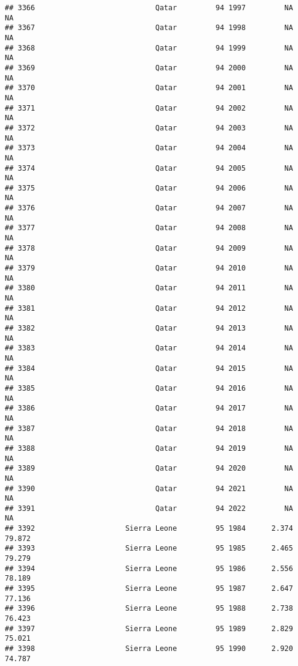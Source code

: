 \documentclass[
]{article}
\begin{document}
\begin{verbatim}
## 3366                            Qatar         94 1997         NA         NA
## 3367                            Qatar         94 1998         NA         NA
## 3368                            Qatar         94 1999         NA         NA
## 3369                            Qatar         94 2000         NA         NA
## 3370                            Qatar         94 2001         NA         NA
## 3371                            Qatar         94 2002         NA         NA
## 3372                            Qatar         94 2003         NA         NA
## 3373                            Qatar         94 2004         NA         NA
## 3374                            Qatar         94 2005         NA         NA
## 3375                            Qatar         94 2006         NA         NA
## 3376                            Qatar         94 2007         NA         NA
## 3377                            Qatar         94 2008         NA         NA
## 3378                            Qatar         94 2009         NA         NA
## 3379                            Qatar         94 2010         NA         NA
## 3380                            Qatar         94 2011         NA         NA
## 3381                            Qatar         94 2012         NA         NA
## 3382                            Qatar         94 2013         NA         NA
## 3383                            Qatar         94 2014         NA         NA
## 3384                            Qatar         94 2015         NA         NA
## 3385                            Qatar         94 2016         NA         NA
## 3386                            Qatar         94 2017         NA         NA
## 3387                            Qatar         94 2018         NA         NA
## 3388                            Qatar         94 2019         NA         NA
## 3389                            Qatar         94 2020         NA         NA
## 3390                            Qatar         94 2021         NA         NA
## 3391                            Qatar         94 2022         NA         NA
## 3392                     Sierra Leone         95 1984      2.374     79.872
## 3393                     Sierra Leone         95 1985      2.465     79.279
## 3394                     Sierra Leone         95 1986      2.556     78.189
## 3395                     Sierra Leone         95 1987      2.647     77.136
## 3396                     Sierra Leone         95 1988      2.738     76.423
## 3397                     Sierra Leone         95 1989      2.829     75.021
## 3398                     Sierra Leone         95 1990      2.920     74.787

\end{verbatim}
\end{document}
